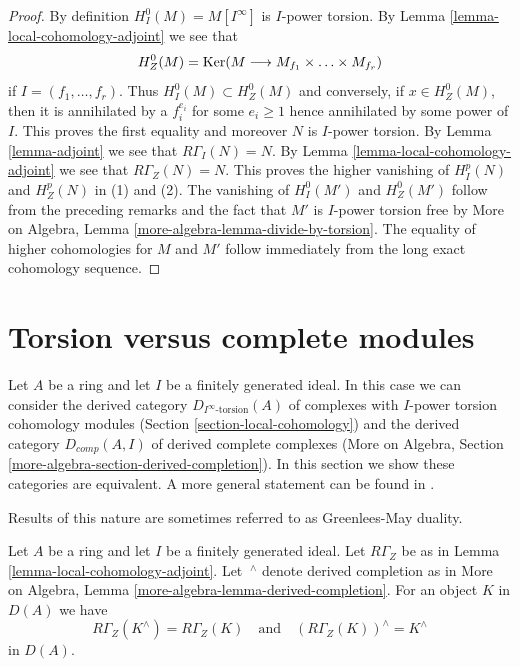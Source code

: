 \begin{proof}
By definition $H^0_I(M) = M[I^\infty]$ is $I$-power torsion.
By Lemma \ref{lemma-local-cohomology-adjoint} we see that
$$
H^0_Z(M) = \mathop{\mathrm{Ker}}(M \longrightarrow M_{f_1} \times \ldots \times M_{f_r})
$$
if $I = (f_1, \ldots, f_r)$. Thus $H^0_I(M) \subset H^0_Z(M)$ and
conversely, if $x \in H^0_Z(M)$, then it is annihilated by a $f_i^{e_i}$
for some $e_i \geq 1$ hence annihilated by some power of $I$.
This proves the first equality and moreover $N$ is $I$-power torsion.
By Lemma \ref{lemma-adjoint} we see that $R\Gamma_I(N) = N$.
By Lemma \ref{lemma-local-cohomology-adjoint} we see that $R\Gamma_Z(N) = N$.
This proves the higher vanishing of $H^p_I(N)$ and $H^p_Z(N)$ in (1) and (2).
The vanishing of $H^0_I(M')$ and $H^0_Z(M')$ follow from the preceding
remarks and the fact that $M'$ is $I$-power torsion free by
More on Algebra, Lemma \ref{more-algebra-lemma-divide-by-torsion}.
The equality of higher cohomologies for $M$ and $M'$ follow
immediately from the long exact cohomology sequence.
\end{proof}









\section{Torsion versus complete modules}
\label{section-torsion-and-complete}

\noindent
Let $A$ be a ring and let $I$ be a finitely generated ideal.
In this case we can consider the derived category
$D_{I^\infty\text{-torsion}}(A)$ of complexes
with $I$-power torsion cohomology modules
(Section \ref{section-local-cohomology})
and the derived category
$D_{comp}(A, I)$ of derived complete complexes
(More on Algebra, Section \ref{more-algebra-section-derived-completion}).
In this section we show these categories are equivalent.
A more general statement can be found in
\cite{Dwyer-Greenlees}.

\begin{lemma}
\label{lemma-complete-and-local}
\begin{slogan}
Results of this nature are sometimes referred to as Greenlees-May duality.
\end{slogan}
Let $A$ be a ring and let $I$ be a finitely generated ideal.
Let $R\Gamma_Z$ be as in Lemma \ref{lemma-local-cohomology-adjoint}.
Let ${\ }^\wedge$ denote derived completion as in
More on Algebra, Lemma \ref{more-algebra-lemma-derived-completion}.
For an object $K$ in $D(A)$ we have
$$
R\Gamma_Z(K^\wedge) = R\Gamma_Z(K)
\quad\text{and}\quad
(R\Gamma_Z(K))^\wedge = K^\wedge
$$
in $D(A)$.
\end{lemma}

